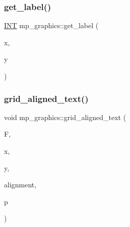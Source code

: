 \mbox{\label{classmp__graphics_a09bbab6f21dcf2ab33d50c73fdeab069}} 
\subsubsection{\texorpdfstring{get\+\_\+label()}{get\_label()}}
{\footnotesize\ttfamily \mbox{\hyperlink{galois_8h_a09fddde158a3a20bd2dcadb609de11dc}{I\+NT}} mp\+\_\+graphics\+::get\+\_\+label (\begin{DoxyParamCaption}\item[{\mbox{\hyperlink{galois_8h_a09fddde158a3a20bd2dcadb609de11dc}{I\+NT}}}]{x,  }\item[{\mbox{\hyperlink{galois_8h_a09fddde158a3a20bd2dcadb609de11dc}{I\+NT}}}]{y }\end{DoxyParamCaption})}

\mbox{\label{classmp__graphics_ad3b57102c2dc4f14d80522513ee92e2d}} 
\subsubsection{\texorpdfstring{grid\+\_\+aligned\+\_\+text()}{grid\_aligned\_text()}}
{\footnotesize\ttfamily void mp\+\_\+graphics\+::grid\+\_\+aligned\+\_\+text (\begin{DoxyParamCaption}\item[{\mbox{\hyperlink{structgrid__frame}{grid\+\_\+frame}} $\ast$}]{F,  }\item[{\mbox{\hyperlink{galois_8h_a09fddde158a3a20bd2dcadb609de11dc}{I\+NT}}}]{x,  }\item[{\mbox{\hyperlink{galois_8h_a09fddde158a3a20bd2dcadb609de11dc}{I\+NT}}}]{y,  }\item[{const char $\ast$}]{alignment,  }\item[{const char $\ast$}]{p }\end{DoxyParamCaption})}

\mbox{\label{classmp__graphics_aa716f1eb8c6738f1f3d3fb8af5925aa3}} 
